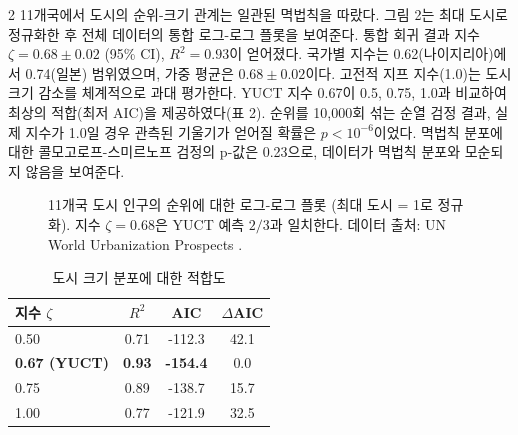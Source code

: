 \documentclass[11pt,a4paper]{article}
\begin{document}
\begin{multicols}{2}
		11개국에서 도시의 순위-크기 관계는 일관된 멱법칙을 따랐다. 그림 2는 최대 도시로 정규화한 후 전체 데이터의 통합 로그-로그 플롯을 보여준다. 통합 회귀 결과 지수 \(\zeta = 0.68 \pm 0.02\) (95\% CI), \(R^2 = 0.93\)이 얻어졌다. 국가별 지수는 0.62(나이지리아)에서 0.74(일본) 범위였으며, 가중 평균은 \(0.68 \pm 0.02\)이다. 고전적 지프 지수(1.0)는 도시 크기 감소를 체계적으로 과대 평가한다. YUCT 지수 0.67이 0.5, 0.75, 1.0과 비교하여 최상의 적합(최저 AIC)을 제공하였다(표 2). 순위를 10,000회 섞는 순열 검정 결과, 실제 지수가 1.0일 경우 관측된 기울기가 얻어질 확률은 \(p < 10^{-6}\)이었다. 멱법칙 분포에 대한 콜모고로프-스미르노프 검정의 p-값은 0.23으로, 데이터가 멱법칙 분포와 모순되지 않음을 보여준다.
		
		\begin{figure}[htbp]
			\centering
			\caption{11개국 도시 인구의 순위에 대한 로그-로그 플롯 (최대 도시 = 1로 정규화). 지수 \(\zeta = 0.68\)은 YUCT 예측 \(2/3\)과 일치한다. 데이터 출처: UN World Urbanization Prospects \cite{UN2018}.}
			\label{fig:cities}
		\end{figure}
		
		\begin{table}[htbp]
			\centering
			\caption{도시 크기 분포에 대한 적합도}
			\label{tab:comparison_cities}
			\begin{tabular}{lccc}
				\toprule
				\textbf{지수 \(\zeta\)} & \(R^2\) & AIC & \(\Delta\)AIC \\
				\midrule
				0.50 & 0.71 & -112.3 & 42.1 \\
				\textbf{0.67 (YUCT)} & \textbf{0.93} & \textbf{-154.4} & 0.0 \\
				0.75 & 0.89 & -138.7 & 15.7 \\
				1.00 & 0.77 & -121.9 & 32.5 \\
				\bottomrule
			\end{tabular}
		\end{table}
		

\end{multicols}
\end{document}
